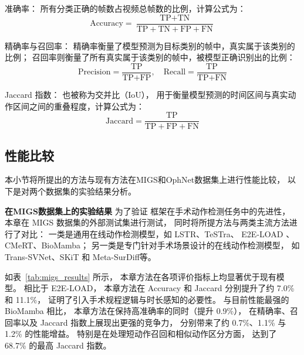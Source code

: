 准确率： 所有分类正确的帧数占视频总帧数的比例，计算公式为：
\begin{equation}
 \text{Accuracy} = \frac{\text{TP} + \text{TN}}{\text{TP} + \text{TN} + \text{FP} + \text{FN}} 
\end{equation}

精确率与召回率： 精确率衡量了模型预测为目标类别的帧中，真实属于该类别的比例；
召回率则衡量了所有真实属于该类别的帧中，被模型正确识别出的比例：
\begin{equation}
\text{Precision} = \frac{\text{TP}}{\text{TP} + \text{FP}}, \quad \text{Recall} = \frac{\text{TP}}{\text{TP} + \text{FN}} 
\end{equation} 

Jaccard 指数： 也被称为交并比（IoU），
用于衡量模型预测的时间区间与真实动作区间之间的重叠程度，计算公式为：
\begin{equation}
 \text{Jaccard} = \frac{\text{TP}}{\text{TP} + \text{FP} + \text{FN}}
\end{equation}

\subsection{性能比较}
本小节将所提出的方法与现有方法在MIGS和OphNet数据集上进行性能比较，
以下是对两个数据集的实验结果分析。

\textbf{在MIGS数据集上的实验结果}\quad
为了验证 \sexytwo 框架在手术动作检测任务中的先进性，
本章在 MIGS 数据集的外部测试集进行测试，
同时将所提方法与两类主流方法进行了对比：
一类是通用在线动作检测模型，如 LSTR\cite{xu2021long}、TeSTra\cite{zhao2022real}、
E2E-LOAD \cite{cao2023e2e}、CMeRT\cite{pang2025context}、BioMamba\cite{wang2025biomamba}；%
另一类是专门针对手术场景设计的在线动作检测模型，
如 Trans-SVNet\cite{gao2021trans}、SKiT\cite{skit2023} 和 Meta-SurDiff\cite{li2025meta}等。

如表~\ref{tab:migs_results} 所示，
本章方法在各项评价指标上均显著优于现有模型。
相比于 E2E-LOAD，
本章方法在 Accuracy 和 Jaccard 分别提升了约 7.0\% 和 11.1\%，
证明了引入手术规程逻辑与时长感知的必要性。
与目前性能最强的 BioMamba 相比，
本章方法在保持高准确率的同时（提升 0.9\%），
在精确率、召回率以及 Jaccard 指数上展现出更强的竞争力，
分别带来了约 0.7\%、1.1\% 与 1.2\% 的性能增益。
特别是在处理短动作召回和相似动作区分方面，
达到了 68.7\% 的最高 Jaccard 指数。

